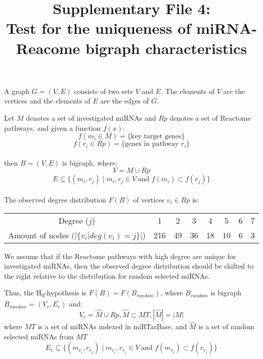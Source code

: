 \documentclass[a4paper, 12pt]{article}
\title{Supplementary File 4: 
	\\Test for the uniqueness of miRNA-Reacome bigraph characteristics}
\date{}
\begin{document}
\maketitle

A graph $G = (V, E)$ consists of two sets $V$ and $E$. The elements of $V$ are the vertices and the elements of $E$ are the edges of $G$.

Let $M$ denotes a set of investigated miRNAs and $Rp$ denotes a set of Reactome pathways, and given a function $f(x)$:
\begin{displaymath}
f(m_{i} \in M)=\{\text{key target genes}\}
\end{displaymath}
\begin{displaymath}
f(r_{i} \in Rp)=\{\text{genes in pathway } r_{i}\}
\end{displaymath}
\\then $B=(V,E)$ is bigraph, where:
\begin{displaymath}
V=M \cup Rp
\end{displaymath}
\begin{displaymath}
E \subseteq \{(m_{i},r_{j}) \mid m_{i},r_{j} \in V\ \text{and } f(m_{i}) \subset f(r_{j})\}
\end{displaymath}
\\The observed degree distribution $F(B)$ of vertices $v_{i}\in Rp$ is:

\begin{center}
	\begin{tabular}{ |c|c|c|c|c|c|c|c| } 
		\hline
		Degree ($j$)& 1 & 2 & 3 & 4 & 5 & 6 & 7 \\ 
		Amount of nodes ($|\{v_{i} | deg(v_{i})=j\}|$)& 216 & 49 & 36 & 18 & 10 & 6 & 3 \\
		\hline
	\end{tabular}
\end{center}

We assume that if the Reactome pathways with high degree are unique for investigated miRNAs, then the observed degree distribution should be shifted to the right relative to the distribution for random selected miRNAs.

Thus, the H\textsubscript{0}-hypothesis is $F(B)=F(B_{random})$, where $B_{random}$ is bigraph $B_{random}=(V_{r},E_{r})$ and:
\begin{displaymath}
	V_{r}=\hat M \cup Rp, \hat M \subset MT, |\hat M| = |M|
\end{displaymath}
where $MT$ is a set of miRNAs indexed in miRTarBase, and $\hat M$ is a set of random selected miRNAs from $MT$
\begin{displaymath}
	E_{r} \subseteq \{(m_{r_{i}},r_{r_{j}}) \mid m_{r_{i}},r_{r_{j}} \in V\ \text{and } f(m_{r_{i}}) \subset f(r_{r_{j}})\}
\end{displaymath}
\end{document}
